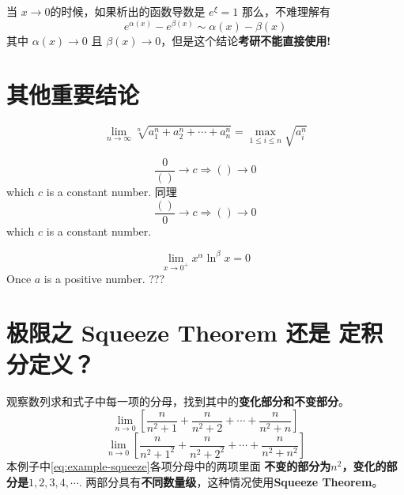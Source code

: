 当 $x\to0$的时候，如果析出的函数导数是 $e^{\xi} = 1$ 那么，不难理解有
\begin{equation}
	e^{\alpha(x)} - e^{\beta(x)} \sim \alpha(x) - \beta(x)
\end{equation}
其中 $\alpha(x) \to 0$ 且 $\beta(x) \to 0$，但是这个结论\textbf{考研不能直接使用!}

\section{其他重要结论}
\begin{lemma}
	\begin{equation}
		\lim_{n \to \infty} \sqrt[n]{a^{n}_{1} + a^{n}_{2} + 
        \cdots + a^{n}_{n}} = \max_{1\leq i \leq n}{\sqrt{a_{i}^{n}}}
	\end{equation}
\end{lemma}

\begin{lemma}
    \begin{equation}
        \frac{0}{()} \to c \Rightarrow () \to 0
    \end{equation}
    which $c$ is a constant number.
    同理
    \begin{equation}
        \frac{()}{0} \to c \Rightarrow () \to 0
    \end{equation}
    which $c$ is a constant number.
\end{lemma}

\begin{lemma}
    \[
        \lim_{x \to 0^+} x^{\alpha} \ln^{\beta}x = 0
    \]
    Once $a$ is a positive number. ??? %
\end{lemma}

\section{极限之 Squeeze Theorem 还是 定积分定义？}
\label{use-squeeze-or-definition-of-integral}

观察数列求和式子中每一项的分母，找到其中的\textbf{变化部分和不变部分}。
\begin{equation} \label{eq:example-squeeze}
	\lim_{n \to 0} \left[ 
	\dfrac{n}{n^2+1} + \dfrac{n}{n^2+2} + \cdots + \dfrac{n}{n^2+n} 
	\right]  
\end{equation}
\begin{equation} \label{eq:example-defination-int}
	\lim_{n \to 0} \left[ 
	\dfrac{n}{n^2+1^2} + \dfrac{n}{n^2+2^2} + \cdots + \dfrac{n}{n^2+n^2} 
	\right]  
\end{equation}
本例子中\ref{eq:example-squeeze}各项分母中的两项里面
\textbf{不变的部分为$n^2$，变化的部分是$1,2,3,4,\cdots$}.
两部分具有\textbf{不同数量级}，这种情况使用\textbf{Squeeze Theorem}。

